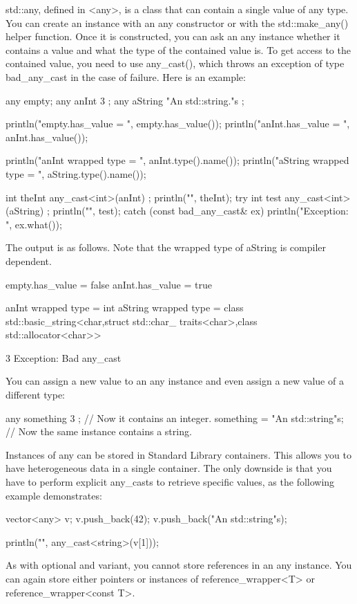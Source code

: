 std::any, defined in <any>, is a class that can contain a single value of any type. You can create an instance with an any constructor or with the std::make\_any() helper function. Once it is constructed, you can ask an any instance whether it contains a value and what the type of the contained value is. To get access to the contained value, you need to use any\_cast(), which throws an exception of type bad\_any\_cast in the case of failure. Here is an example:

\begin{cpp}
any empty;
any anInt { 3 };
any aString { "An std::string."s };

println("empty.has_value = {}", empty.has_value());
println("anInt.has_value = {}\n", anInt.has_value());

println("anInt wrapped type = {}", anInt.type().name());
println("aString wrapped type = {}\n", aString.type().name());

int theInt { any_cast<int>(anInt) };
println("{}", theInt);
try {
    int test { any_cast<int>(aString) };
    println("{}", test);
} catch (const bad_any_cast& ex) {
    println("Exception: {}", ex.what());
}
\end{cpp}

The output is as follows. Note that the wrapped type of aString is compiler dependent.

\begin{shell}
empty.has_value = false
anInt.has_value = true

anInt wrapped type = int
aString wrapped type = class std::basic_string<char,struct std::char_
traits<char>,class std::allocator<char>>

3
Exception: Bad any_cast
\end{shell}

You can assign a new value to an any instance and even assign a new value of a different type:

\begin{cpp}
any something { 3 }; // Now it contains an integer.
something = "An std::string"s; // Now the same instance contains a string.
\end{cpp}

Instances of any can be stored in Standard Library containers. This allows you to have heterogeneous data in a single container. The only downside is that you have to perform explicit any\_casts to retrieve specific values, as the following example demonstrates:

\begin{cpp}
vector<any> v;
v.push_back(42);
v.push_back("An std::string"s);

println("{}", any_cast<string>(v[1]));
\end{cpp}

As with optional and variant, you cannot store references in an any instance. You can again store either pointers or instances of reference\_wrapper<T> or reference\_wrapper<const T>.




